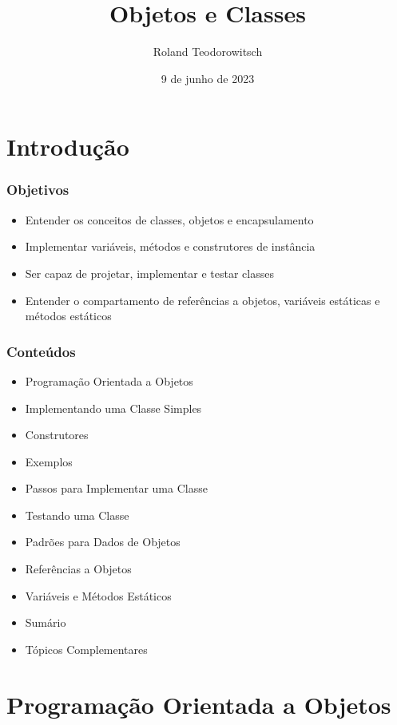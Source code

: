 \documentclass[xcolor={dvipsnames,table},aspectratio=169]{beamer}
\title[\sc{Objetos e Classes}]{Objetos e Classes}
\author[Roland Teodorowitsch]{Roland Teodorowitsch}
\institute[FPROG - EP - PUCRS]{Fundamentos de Programação - Escola Politécnica - PUCRS}
\date{9 de junho de 2023}
\begin{document}
\justifying

\begin{frame}
	\titlepage
\end{frame}

\section{Introdução}

\begin{frame}\frametitle{Objetivos}
\begin{itemize}
	\item Entender os conceitos de classes, objetos e encapsulamento
	\item Implementar variáveis, métodos e construtores de instância
	\item Ser capaz de projetar, implementar e testar classes
	\item Entender o compartamento de referências a objetos, variáveis estáticas e métodos estáticos
\end{itemize}
\end{frame}

\begin{frame}\frametitle{Conteúdos}
\begin{itemize}
	\item Programação Orientada a Objetos
	\item Implementando uma Classe Simples
	\item Construtores
	\item Exemplos
	\item Passos para Implementar uma Classe

	\item Testando uma Classe
	\item Padrões para Dados de Objetos
	\item Referências a Objetos
	\item Variáveis e Métodos Estáticos
	\item Sumário
	\item Tópicos Complementares
\end{itemize}
\end{frame}

\section{Programação Orientada a Objetos}
\end{document}
